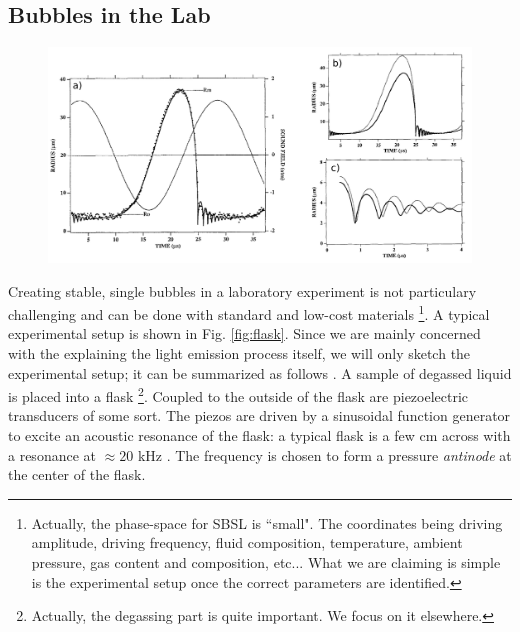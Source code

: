 \documentclass[rmp,aps,nofootinbib,superscriptaddress,floatfix]{revtex4-2}
\begin{document}
\subsection{Bubbles in the Lab}
\begin{figure}
\includegraphics[width=0.9\linewidth]{figs/bubble_radius_1.pdf}
    \caption{\cite{barber1997defining,barber1992light}}
\label{fig:bubble_radius_1}
\end{figure}

Creating stable, single bubbles in a laboratory experiment is not particulary challenging and can be done with standard and low-cost materials \footnote{Actually, the phase-space for SBSL is ``small". The coordinates being driving amplitude, driving frequency, fluid composition, temperature, ambient pressure, gas content and composition, etc... What we are claiming is simple is the experimental setup once the correct parameters are identified.}. A typical experimental setup is shown in Fig. \ref{fig:flask}. Since we are mainly concerned with the explaining the light emission process itself, we will only sketch the experimental setup; it can be summarized as follows \cite{lentz1995mie,gaitan1990experimental,gaitan1992sonoluminescence,gompf2000mie,brenner2002single,yasui2018acoustic,brennen2014cavitation,suslick2008inside}. A sample of degassed liquid is placed into a flask \footnote{Actually, the degassing part is quite important. We focus on it elsewhere.}. Coupled to the outside of the flask are piezoelectric transducers of some sort. The piezos are driven by a sinusoidal function generator to excite an acoustic resonance of the flask: a typical flask is a few cm across with a resonance at $\approx 20$ kHz \cite{brenner2002single}. The frequency is chosen to form a pressure \emph{antinode} at the center of the flask.
\end{document}
